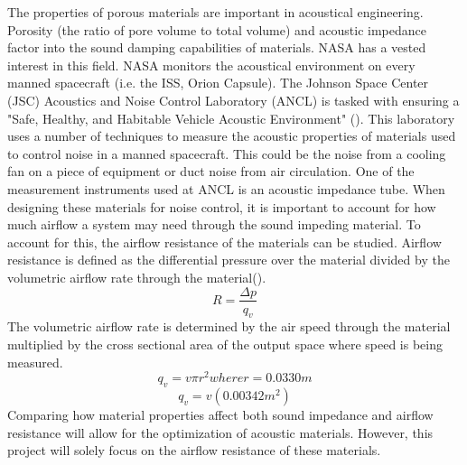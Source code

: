 	The properties of porous materials are important in acoustical engineering. Porosity (the 
ratio of pore volume to total volume) and acoustic impedance factor into the sound damping 
capabilities of materials. NASA has a vested interest in this field. NASA monitors the acoustical 
environment on every manned spacecraft (i.e. the ISS, Orion Capsule). The Johnson Space Center 
(JSC) Acoustics and Noise Control Laboratory (ANCL) is tasked with ensuring a "Safe, Healthy, and 
Habitable Vehicle Acoustic Environment" (\cite{nasa_acoustics}). This laboratory uses a number of 
techniques to measure the acoustic properties of materials used to control noise in a manned 
spacecraft. This could be the noise from a cooling fan on a piece of equipment or duct noise from
air circulation. One of the measurement instruments used at ANCL is an acoustic impedance tube.
	When designing these materials for noise control, it is important to account 
for how much airflow a system may need through the sound impeding material. To account for this,
the airflow resistance of the materials can be studied. Airflow resistance is defined as the 
differential pressure over the material divided by the volumetric airflow rate through the 
material(\cite{liu2018numerical}).
\begin{equation} \label{Airflow Resistance} 
R= \frac{\Delta p}{q_v}
\end{equation}
The volumetric airflow rate is determined by the air speed through the material multiplied by the 
cross sectional area of the output space where speed is being measured.
\begin{equation}
q_v = v \pi r^2 where r = 0.0330 m
\end{equation}
\begin{equation}
q_v = v(0.00342 m^2)
\end{equation}
Comparing how material properties affect both sound impedance and airflow resistance will allow for 
the optimization of acoustic materials. However, this project will solely focus on the airflow 
resistance of these materials. 
